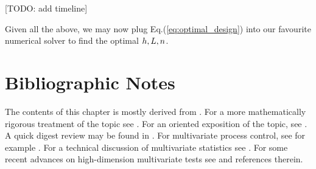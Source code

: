 [TODO: add timeline]

Given all the above, we may now plug Eq.(\ref{eq:optimal_design}) into our favourite numerical solver to find the optimal $h,L,n$.





\section{Bibliographic Notes}
The contents of this chapter is mostly derived from \cite{montgomery_introduction_2007}. 
For a more mathematically rigorous treatment of the topic see \cite{basseville_detection_1993}.
For an \R oriented exposition of the topic, see \cite{qiu_introduction_2013}.
A quick digest review may be found in \cite{natrella_nist/sematech_2010}.
For multivariate process control, see for example \cite{ge_multivariate_2012}. 
For a technical discussion of multivariate statistics see \cite{anderson_introduction_2003}. 
For some recent advances on high-dimension multivariate tests see \cite{srivastava_testing_2013} and references therein.
